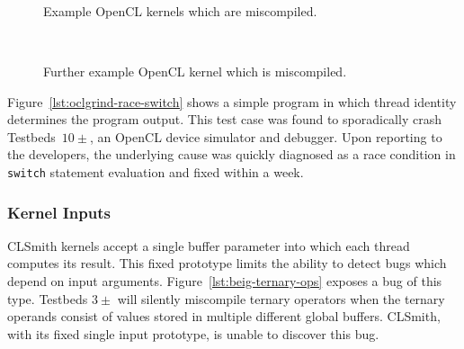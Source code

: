 
\begin{figure}
  \centering %
  \\%
  \\%
  \\%
  \caption[Example kernels which are miscompiled]{%
    Example OpenCL kernels which are miscompiled.%
  }%
\end{figure}


\begin{figure}
  \centering %
  \\%
  \caption[Further example kernel which is miscompiled]{%
    Further example OpenCL kernel which is miscompiled.%
  }%
\end{figure}

Figure~\ref{lst:oclgrind-race-switch} shows a simple program in which thread identity determines the program output. This test case was found to sporadically crash Testbeds~$10\pm$, an OpenCL device simulator and debugger. Upon reporting to the developers, the underlying cause was quickly diagnosed as a race condition in \texttt{switch} statement evaluation and fixed within a week.


\subsubsection{Kernel Inputs}

CLSmith kernels accept a single buffer parameter into which each thread computes its result. This fixed prototype limits the ability to detect bugs which depend on input arguments. Figure~\ref{lst:beig-ternary-ops} exposes a bug of this type. Testbeds $3\pm$ will silently miscompile ternary operators when the ternary operands consist of values stored in multiple different global buffers. CLSmith, with its fixed single input prototype, is unable to discover this bug.


